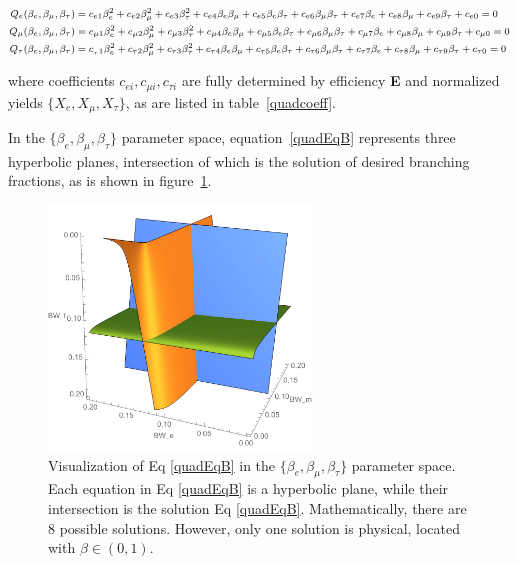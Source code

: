 \begin{equation} \label{quadEqB}
    \footnotesize
	\begin{split}
        Q_e(\beta_e,\beta_\mu,\beta_\tau) &=
        c_{e1} \beta_e^2 + c_{e2} \beta_\mu^2 + c_{e3} \beta_\tau^2 + 
        c_{e4} \beta_e\beta_\mu + c_{e5} \beta_e\beta_\tau + c_{e6} \beta_\mu\beta_\tau +
        c_{e7} \beta_e + c_{e8} \beta_\mu + c_{e9} \beta_\tau + c_{e0} = 0 \\
        Q_\mu(\beta_e,\beta_\mu,\beta_\tau) &= 
        c_{\mu 1} \beta_e^2 + c_{\mu 2} \beta_\mu^2 + c_{\mu 3} \beta_\tau^2 + 
        c_{\mu 4} \beta_e\beta_\mu + c_{\mu 5} \beta_e\beta_\tau + c_{\mu 6} \beta_\mu\beta_\tau +
        c_{\mu 7} \beta_e + c_{\mu 8} \beta_\mu + c_{\mu 9} \beta_\tau + c_{\mu 0} = 0 \\
        Q_\tau(\beta_e,\beta_\mu,\beta_\tau) &= 
        c_{_\tau1} \beta_e^2 + c_{\tau2} \beta_\mu^2 + c_{\tau3} \beta_\tau^2 + 
        c_{\tau4} \beta_e\beta_\mu + c_{\tau5} \beta_e\beta_\tau + c_{\tau6} \beta_\mu\beta_\tau +
        c_{\tau7} \beta_e + c_{\tau8} \beta_\mu + c_{\tau9} \beta_\tau + c_{\tau0} = 0 
    \end{split}
\end{equation}

where coefficients $c_{ei},c_{\mu i},c_{\tau i}$ are fully determined 
by efficiency \textbf{E} and normalized yields $\{X_{e},X_{\mu},X_{\tau}\}$,
as are listed in table~\ref{quadcoeff}.




In the $\{\beta_{e},\beta_{\mu},\beta_{\tau}\}$ parameter space, 
equation~\ref{quadEqB} represents three hyperbolic planes, intersection 
of which is the solution of desired branching fractions, as is shown
in figure~\ref{visualize}.


\begin{figure}[ht]
    \centering
    \includegraphics[width=7cm]{chapters/Analysis/sectionStatisticalAnalysis/figures/visual.png}
    
    \caption{Visualization of Eq \ref{quadEqB} in the
    \(\{\beta_{e},\beta_{\mu},\beta_{\tau}\}\) parameter space. Each
    equation in Eq \ref{quadEqB} is a hyperbolic plane, while their
    intersection is the solution Eq \ref{quadEqB}. Mathematically, there
    are 8 possible solutions. However, only one solution is physical,
    located with \(\beta \in (0,1) \). }
    \label{visualize}
\end{figure}

